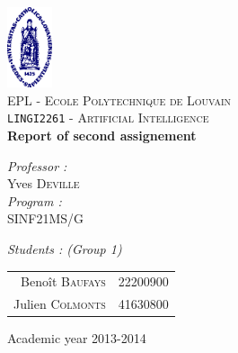 \begin{titlepage}
 
\begin{center}
 
\vspace*{-2cm}\includegraphics[width=0.10\textwidth]{ucl.png}\\[1cm]
 
\textsc{\LARGE EPL - Ecole Polytechnique de Louvain}\\[1.5cm]
 
\textsc{\Large \texttt{LINGI2261} - Artificial Intelligence}\\[0.5cm]
 
 
\vspace{1.0cm}
{ \huge \bfseries Report of second assignement\vspace{0.8cm}\\}
 
\vspace{1.0cm}
 
\begin{minipage}{0.4\textwidth}
\begin{flushleft} \large
\emph{Professor :}\\
	Yves \textsc{Deville}\\
\vspace{1cm}
\emph{Program :}\\
	SINF21MS/G
\end{flushleft}
\end{minipage}
\begin{minipage}{0.4\textwidth}
\begin{flushright} \large
\emph{Students : (Group 1)} \\
\begin{tabular}{rl}
	Benoît \textsc{Baufays}		& {\footnotesize 22200900}\\
	Julien \textsc{Colmonts}	& {\footnotesize 41630800}\\
\end{tabular}
\end{flushright}
\end{minipage}
 
\vfill
 
\vspace{1.1cm}
{\large Academic year 2013-2014}
\vspace{-1cm} 
\end{center}
 
\end{titlepage}

